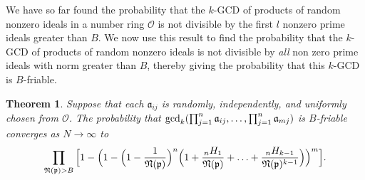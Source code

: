 \documentclass[12pt]{amsart}
\newtheorem{theorem}{Theorem}[subsection]
\theoremstyle{definition}
\newcommand{\f}[1]{\mathfrak{#1}}
\begin{document}
We have so far found the probability that the $k$-GCD of products of random nonzero ideals in a number ring $\mathcal{O}$ is not divisible by the first \(l\) nonzero prime ideals greater than \(B\). We now use this result to find the probability that the $k$-GCD of products of random nonzero ideals is not divisible by \textit{all} non zero prime ideals with norm greater than $B$, thereby giving the probability that this $k$-GCD is $B$-friable.

\begin{theorem}
Suppose that each $\f{a}_{ij}$ is randomly, independently, and uniformly chosen from $\mathcal{O}$. The probability that $\gcd_k(\prod_{j=1}^{n}\f{a}_{ij},\mathellipsis,\prod_{j=1}^{n}\f{a}_{mj})$ is $B$-friable converges as $N\to\infty$ to $$\prod_{\f{N}(\f{p})>B} \Big[1 - \Big(1 -\Big(1-\frac{1}{\f{N}(\f{p})}\Big)^n\Big(1+\frac{{}_nH_1}{\f{N}(\f{p})}+\mathellipsis+\frac{{}_nH_{k-1}}{\f{N}(\f{p})^{k-1}}\Big)\Big)^m\Big].$$
\end{theorem}
\end{document}
